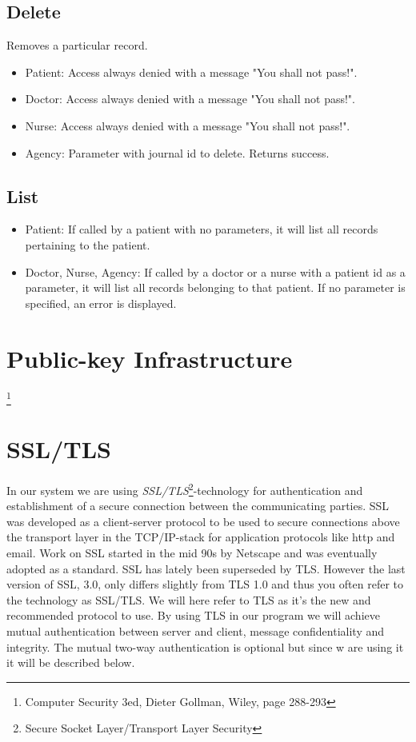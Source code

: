 \documentclass[10pt, a4paper]{article}
\begin{document}
\subsection{Delete}
Removes a particular record.
\begin{itemize}
\item Patient: Access always denied with a message "You shall not pass!".
\item Doctor: Access always denied with a message "You shall not pass!".
\item Nurse: Access always denied with a message "You shall not pass!".
\item Agency: Parameter with journal id to delete. Returns success.
\end{itemize}

\subsection{List}
\begin{itemize}
\item Patient: If called by a patient with no parameters, it will list all records pertaining to the patient.
\item Doctor, Nurse, Agency: If called by a doctor or a nurse with a patient id as a parameter, it will list all records belonging to that patient. If no parameter is specified, an error is displayed.
\end{itemize}

\section{Public-key Infrastructure}
\label{sec+pki}

\footnote{Computer Security 3ed, Dieter Gollman, Wiley, page 288-293}

\section{SSL/TLS}
\label{sec+tls}
In our system we are using \emph{SSL/TLS}\footnote{Secure Socket Layer/Transport Layer Security}-technology for authentication and establishment of a secure connection between the communicating parties. SSL was developed as a client-server protocol to be used to secure connections above the transport layer in the TCP/IP-stack for application protocols like http and email. Work on SSL started in the mid 90s by Netscape and was eventually adopted as a standard. SSL has lately been superseded by TLS. However the last version of SSL, 3.0, only differs slightly from TLS 1.0 and thus you often refer to the technology as SSL/TLS. We will here refer to TLS as it's the new  and recommended protocol to use. By using TLS in our program we will achieve mutual authentication between server and client, message confidentiality and integrity. The mutual two-way authentication is optional but since w are using it it will be described below.
\end{document}
